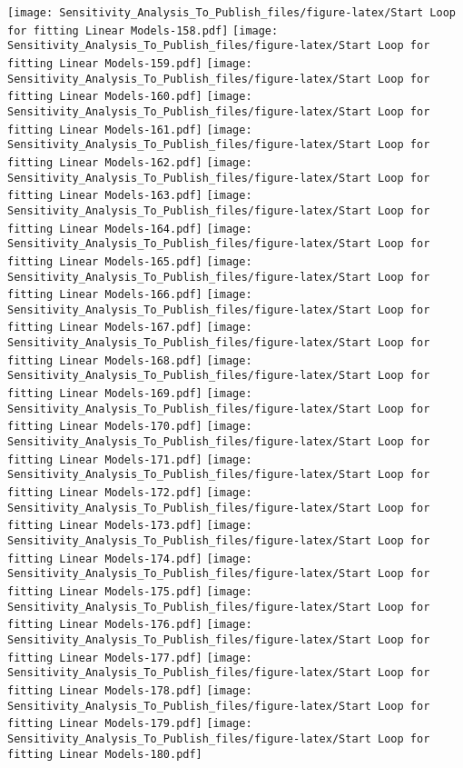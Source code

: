 \documentclass[
]{article}
\begin{document}
\texttt{[image: Sensitivity\_Analysis\_To\_Publish\_files/figure-latex/Start Loop for fitting Linear Models-158.pdf]}
\texttt{[image: Sensitivity\_Analysis\_To\_Publish\_files/figure-latex/Start Loop for fitting Linear Models-159.pdf]}
\texttt{[image: Sensitivity\_Analysis\_To\_Publish\_files/figure-latex/Start Loop for fitting Linear Models-160.pdf]}
\texttt{[image: Sensitivity\_Analysis\_To\_Publish\_files/figure-latex/Start Loop for fitting Linear Models-161.pdf]}
\texttt{[image: Sensitivity\_Analysis\_To\_Publish\_files/figure-latex/Start Loop for fitting Linear Models-162.pdf]}
\texttt{[image: Sensitivity\_Analysis\_To\_Publish\_files/figure-latex/Start Loop for fitting Linear Models-163.pdf]}
\texttt{[image: Sensitivity\_Analysis\_To\_Publish\_files/figure-latex/Start Loop for fitting Linear Models-164.pdf]}
\texttt{[image: Sensitivity\_Analysis\_To\_Publish\_files/figure-latex/Start Loop for fitting Linear Models-165.pdf]}
\texttt{[image: Sensitivity\_Analysis\_To\_Publish\_files/figure-latex/Start Loop for fitting Linear Models-166.pdf]}
\texttt{[image: Sensitivity\_Analysis\_To\_Publish\_files/figure-latex/Start Loop for fitting Linear Models-167.pdf]}
\texttt{[image: Sensitivity\_Analysis\_To\_Publish\_files/figure-latex/Start Loop for fitting Linear Models-168.pdf]}
\texttt{[image: Sensitivity\_Analysis\_To\_Publish\_files/figure-latex/Start Loop for fitting Linear Models-169.pdf]}
\texttt{[image: Sensitivity\_Analysis\_To\_Publish\_files/figure-latex/Start Loop for fitting Linear Models-170.pdf]}
\texttt{[image: Sensitivity\_Analysis\_To\_Publish\_files/figure-latex/Start Loop for fitting Linear Models-171.pdf]}
\texttt{[image: Sensitivity\_Analysis\_To\_Publish\_files/figure-latex/Start Loop for fitting Linear Models-172.pdf]}
\texttt{[image: Sensitivity\_Analysis\_To\_Publish\_files/figure-latex/Start Loop for fitting Linear Models-173.pdf]}
\texttt{[image: Sensitivity\_Analysis\_To\_Publish\_files/figure-latex/Start Loop for fitting Linear Models-174.pdf]}
\texttt{[image: Sensitivity\_Analysis\_To\_Publish\_files/figure-latex/Start Loop for fitting Linear Models-175.pdf]}
\texttt{[image: Sensitivity\_Analysis\_To\_Publish\_files/figure-latex/Start Loop for fitting Linear Models-176.pdf]}
\texttt{[image: Sensitivity\_Analysis\_To\_Publish\_files/figure-latex/Start Loop for fitting Linear Models-177.pdf]}
\texttt{[image: Sensitivity\_Analysis\_To\_Publish\_files/figure-latex/Start Loop for fitting Linear Models-178.pdf]}
\texttt{[image: Sensitivity\_Analysis\_To\_Publish\_files/figure-latex/Start Loop for fitting Linear Models-179.pdf]}
\texttt{[image: Sensitivity\_Analysis\_To\_Publish\_files/figure-latex/Start Loop for fitting Linear Models-180.pdf]}
\end{document}
